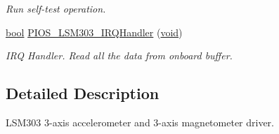 \begin{DoxyCompactItemize}
\begin{DoxyCompactList}\small\item\em Run self-\/test operation. \end{DoxyCompactList}\item 
\hyperlink{group___exported__types_gaf6a258d8f3ee5206d682d799316314b1}{bool} \hyperlink{group___p_i_o_s___l_s_m303_gac6bc0a694ea85c9644a96c5558b75a7d}{P\-I\-O\-S\-\_\-\-L\-S\-M303\-\_\-\-I\-R\-Q\-Handler} (\hyperlink{group___n_a_m_e_ga18028b8badbf1ea7e704ccac3c488e82}{void})
\begin{DoxyCompactList}\small\item\em I\-R\-Q Handler. Read all the data from onboard buffer. \end{DoxyCompactList}\end{DoxyCompactItemize}


\subsection{Detailed Description}
L\-S\-M303 3-\/axis accelerometer and 3-\/axis magnetometer driver. 

